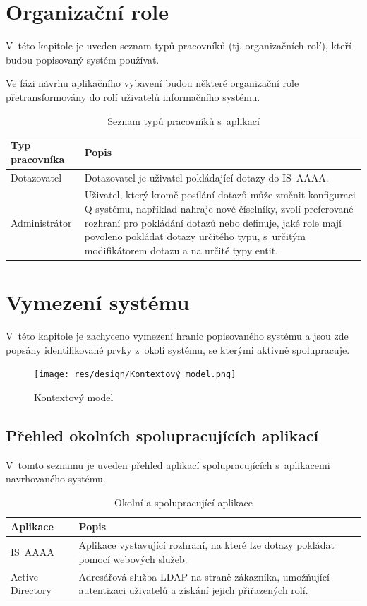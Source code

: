 \documentclass[thesis=M,czech]{FITthesis}[2019/12/23]
\begin{document}
\section{Organizační role}
V~této kapitole je uveden seznam typů pracovníků (tj. organizačních rolí), kteří budou popisovaný systém používat.

Ve fázi návrhu aplikačního vybavení budou některé organizační role přetransformovány do rolí uživatelů informačního systému.

\begin{table}[H]
	\centering
	\begin{tabular}{|p{}|p{}|}
		\hline
  		{\textbf{Typ \mbox{pracovníka}}} & {\textbf{Popis}} \\	
  		\hline \hline
  		Dotazovatel & Dotazovatel je uživatel pokládající dotazy do IS~AAAA.  \\ \hline
		Administrátor & Uživatel, který kromě posílání dotazů může změnit konfiguraci Q-systému, například nahraje nové číselníky, zvolí preferované rozhraní pro pokládání dotazů nebo definuje, jaké role mají povoleno pokládat dotazy určitého typu, s~určitým modifikátorem dotazu a na určité typy entit.  \\ \hline
	\end{tabular}
 	\caption{Seznam typů pracovníků s~aplikací}
\label{tab:Seznam typů pracovníků s~aplikací}
\end{table}

\section{Vymezení systému}
V~této kapitole je zachyceno vymezení hranic popisovaného systému a jsou zde popsány identifikované prvky z~okolí systému, se kterými aktivně spolupracuje.
\begin{figure}[H]
  \centering
  \texttt{[image: res/design/Kontextový model.png]}
  \caption{Kontextový model}
  \label{fig:Kontextový model}
\end{figure}

\subsection{Přehled okolních spolupracujících aplikací}
V~tomto seznamu je uveden přehled aplikací spolupracujících s~aplikacemi navrhovaného systému.

\begin{table}[H]
	\centering
	\begin{tabular}{|p{}|p{}|}
		\hline
  		{\textbf{Aplikace}} & {\textbf{Popis}} \\
  		\hline \hline
  		IS~AAAA & Aplikace vystavující rozhraní, na které lze dotazy pokládat pomocí webových služeb. \\ \hline
		Active \mbox{Directory} & Adresářová služba LDAP na straně zákazníka, umožňující autentizaci uživatelů a získání jejich přiřazených rolí. \\ \hline
	\end{tabular}
 	\caption{Okolní a spolupracující aplikace}
	\label{tab:Okolní a spolupracující aplikace}
\end{table}
\end{document}

